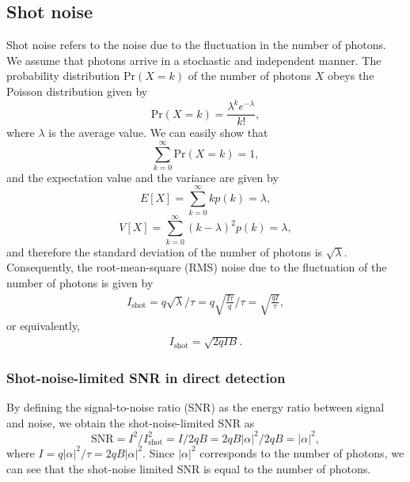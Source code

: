 \subsection{Shot noise}
Shot noise refers to the noise due to the fluctuation in the number of photons. We assume that photons arrive in a stochastic and independent manner. The probability distribution $\mathrm{Pr}(X = k)$ of the number of photons $X$ obeys the Poisson distribution given by
\begin{equation}
	\mathrm{Pr}(X=k) = \frac{\lambda^k e^{-\lambda}}{k!},
\end{equation}
where $\lambda$ is the average value. We can easily show that 
\begin{equation}
	\sum_{k=0}^\infty \mathrm{Pr}(X=k) = 1,
\end{equation}
and the expectation value and the variance are given by
\begin{equation}
	E[X] = \sum_{k=0}^\infty kp(k) = \lambda,
\end{equation}
\begin{equation}
  	V[X] = \sum_{k=0}^\infty (k-\lambda)^2p(k) = \lambda,
\end{equation}
and therefore the standard deviation of the number of photons is $\sqrt \lambda$. 
Consequently, the root-mean-square (RMS) noise due to the fluctuation of the number of photons is given by
\begin{equation}
	\begin{aligned}
		I_{\mathrm{shot}} = q\sqrt{\lambda}/\tau = q\sqrt{\frac{I\tau}{q}}/\tau = \sqrt{\frac{qI}{\tau}},
	\end{aligned}
\end{equation}
or equivalently,
\begin{equation}
	\begin{aligned}
		I_\mathrm{shot}=\sqrt{2qIB}.
	\end{aligned}
\end{equation}

\subsubsection{Shot-noise-limited SNR in direct detection}

By defining the signal-to-noise ratio (SNR) as the energy ratio between signal and noise, we obtain the shot-noise-limited SNR as
\begin{equation}
  \mathrm{SNR} = I^2 / I_\mathrm{shot}^2 = I/2qB = 2qB|\alpha |^2/2qB = |\alpha|^2,
\end{equation}
where $I=q|\alpha|^2/\tau = 2qB|\alpha|^2$. Since $|\alpha|^2$ corresponds to the number of photons, we can see that the shot-noise limited SNR is equal to the number of photons.

